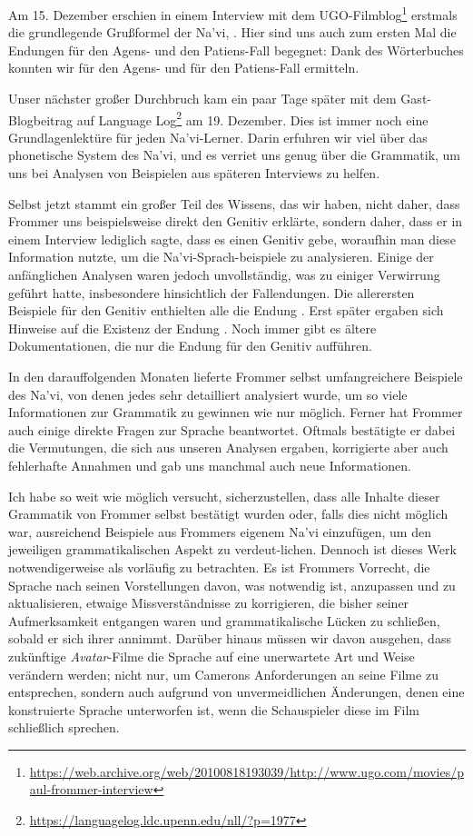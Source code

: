 Am 15. Dezember erschien in einem Interview mit dem UGO-Filmblog\footnote{\url{https://web.archive.org/web/20100818193039/http://www.ugo.com/movies/paul-frommer-interview}} erstmals die grundlegende Grußformel der Na'vi,  . Hier sind uns auch zum ersten Mal die Endungen für den Agens- und den Patiens-Fall begegnet: Dank des Wörterbuches konnten wir  für den Agens- und  für den Patiens-Fall ermitteln.

Unser nächster großer Durchbruch kam ein paar Tage später mit dem Gast-Blogbeitrag auf Language Log\footnote{\url{https://languagelog.ldc.upenn.edu/nll/?p=1977}} am 19. Dezember. Dies ist immer noch eine Grundlagenlektüre für jeden Na'vi-Lerner. Darin erfuhren wir viel über das phonetische System des
Na'vi, und es verriet uns genug über die Grammatik, um uns bei Analysen von Beispielen aus späteren Interviews zu helfen.

Selbst jetzt stammt ein großer Teil des Wissens, das wir haben, nicht daher, dass Frommer uns beispielsweise direkt den Genitiv erklärte, sondern daher, dass er in einem Interview lediglich sagte, dass es einen Genitiv gebe, woraufhin man diese Information nutzte, um die  Na’vi-Sprach-beispiele zu analysieren. Einige der anfänglichen Analysen waren jedoch unvollständig, was zu einiger Verwirrung geführt hatte, insbesondere hinsichtlich der Fallendungen. Die allerersten Beispiele für den Genitiv enthielten alle die Endung . Erst später ergaben sich Hinweise auf die Existenz der
Endung . Noch immer gibt es ältere Dokumentationen, die nur die Endung  für den Genitiv aufführen.

In den darauffolgenden Monaten lieferte Frommer selbst umfangreichere Beispiele des Na'vi, von denen jedes sehr detailliert analysiert wurde, um so viele Informationen zur Grammatik zu gewinnen wie nur möglich. Ferner hat Frommer auch einige direkte Fragen zur Sprache beantwortet. Oftmals bestätigte er dabei die Vermutungen, die sich aus unseren Analysen ergaben, korrigierte aber auch fehlerhafte Annahmen und gab uns manchmal auch neue Informationen.

Ich habe so weit wie möglich versucht, sicherzustellen, dass alle Inhalte dieser Grammatik von Frommer selbst bestätigt wurden oder, falls dies nicht möglich war, ausreichend Beispiele aus Frommers eigenem Na'vi einzufügen, um den jeweiligen grammatikalischen Aspekt zu verdeut-lichen. Dennoch ist dieses Werk notwendigerweise als vorläufig zu betrachten. Es ist Frommers Vorrecht, die Sprache nach seinen Vorstellungen davon, was notwendig ist, anzupassen und zu aktualisieren, etwaige Missverständnisse zu korrigieren, die bisher seiner Aufmerksamkeit entgangen waren und grammatikalische Lücken zu schließen, sobald er sich ihrer annimmt. Darüber hinaus müssen wir davon ausgehen, dass zukünftige \textit{Avatar}-Filme die Sprache auf eine unerwartete Art und Weise verändern werden; nicht nur, um Camerons Anforderungen an seine Filme zu entsprechen, sondern auch aufgrund von unvermeidlichen Änderungen, denen eine konstruierte Sprache unterworfen ist, wenn die Schauspieler diese im Film schließlich sprechen.


